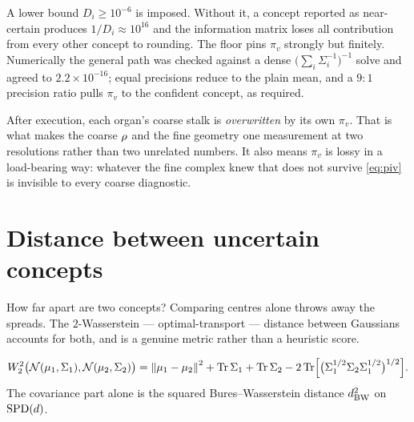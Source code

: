 \begin{remark}
A lower bound $D_i\ge10^{-6}$ is imposed. Without it, a concept reported
as near-certain produces $1/D_i\approx10^{16}$ and the information
matrix loses all contribution from every other concept to rounding. The
floor pins $\pi_v$ strongly but finitely. Numerically the general path
was checked against a dense $\bigl(\sum_i\Sigma_i^{-1}\bigr)^{-1}$ solve
and agreed to $2.2\times10^{-16}$; equal precisions reduce to the plain
mean, and a $9{:}1$ precision ratio pulls $\pi_v$ to the confident
concept, as required.
\end{remark}

\begin{remark}\label{rem:glue}
After execution, each organ's coarse stalk is \emph{overwritten} by its
own $\pi_v$. That is what makes the coarse $\rho$ and the fine
geometry one measurement at two resolutions rather than two unrelated
numbers. It also means $\pi_v$ is lossy in a load-bearing way: whatever
the fine complex knew that does not survive \eqref{eq:piv} is invisible
to every coarse diagnostic.
\end{remark}

\section{Distance between uncertain concepts}

\begin{intu}\Intu
How far apart are two concepts? Comparing centres alone throws away the
spreads. The $2$-Wasserstein --- optimal-transport --- distance between
Gaussians accounts for both, and is a genuine metric rather than a
heuristic score.
\end{intu}

\begin{definition}\label{def:bures}
\begin{equation}\label{eq:bures}
  W_2^2\bigl(\mathcal N(\mu_1,\Sigma_1),\mathcal N(\mu_2,\Sigma_2)\bigr)
  =\left\lVert \mu_1-\mu_2 \right\rVert^2+\operatorname{Tr}\Sigma_1+\operatorname{Tr}\Sigma_2
   -2\operatorname{Tr}\Bigl[\bigl(\Sigma_1^{1/2}\Sigma_2\Sigma_1^{1/2}\bigr)^{1/2}\Bigr].
\end{equation}
The covariance part alone is the squared Bures--Wasserstein distance
$d_{\mathrm{BW}}^2$ on $\mathrm{SPD}(d)$.
\end{definition}

